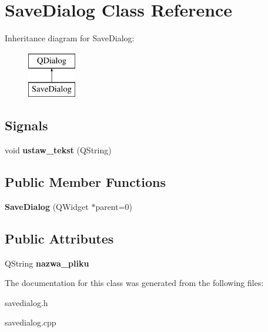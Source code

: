 \hypertarget{class_save_dialog}{}\section{Save\+Dialog Class Reference}
\label{class_save_dialog}
Inheritance diagram for Save\+Dialog\+:\begin{figure}[H]
\begin{center}
\leavevmode
\includegraphics[height=2.000000cm]{class_save_dialog}
\end{center}
\end{figure}
\subsection*{Signals}
\begin{DoxyCompactItemize}
\item 
\mbox{\label{class_save_dialog_a6b8f2bf657333aa893275ef4c7f475ee}} 
void {\bfseries ustaw\+\_\+tekst} (Q\+String)
\end{DoxyCompactItemize}
\subsection*{Public Member Functions}
\begin{DoxyCompactItemize}
\item 
\mbox{\label{class_save_dialog_ac4383e86eb3ff07ce1cd14bc733ea6c7}} 
{\bfseries Save\+Dialog} (Q\+Widget $\ast$parent=0)
\end{DoxyCompactItemize}
\subsection*{Public Attributes}
\begin{DoxyCompactItemize}
\item 
\mbox{\label{class_save_dialog_a65e839096b4699b16c41be7899743ff4}} 
Q\+String {\bfseries nazwa\+\_\+pliku}
\end{DoxyCompactItemize}


The documentation for this class was generated from the following files\+:\begin{DoxyCompactItemize}
\item 
savedialog.\+h\item 
savedialog.\+cpp\end{DoxyCompactItemize}
